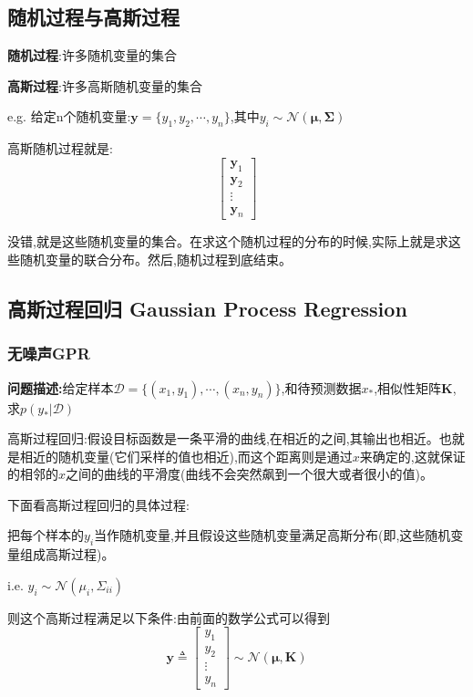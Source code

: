 \documentclass[UTF8,a4paper]{ctexart}
\begin{document}
        \subsection{随机过程与高斯过程}
        \textbf{随机过程}:许多随机变量的集合

        \textbf{高斯过程}:许多高斯随机变量的集合

        e.g. 给定n个随机变量:$\bm{y} = \{y_1 , y_2 , \cdots , y_n\}$,其中$y_i\sim \mathcal{N}(\bm{\mu} , \bm \Sigma )$

        高斯随机过程就是:
        \begin{equation}
            \left [
                \begin{array}{c}
                \bm y_1 \\
                \bm y_2\\
                \vdots \\
                \bm y_n
                \end{array}
            \right ]
        \end{equation}

        {\color{blue} 没错,就是这些随机变量的集合。在求这个随机过程的分布的时候,实际上就是求这些随机变量的联合分布。然后,随机过程到底结束。}

        \subsection{高斯过程回归  Gaussian Process Regression}
            \subsubsection{无噪声GPR}
            \textbf{问题描述:}给定样本$\mathcal{D} = \{ (x_1, y_1) , \cdots , (x_n , y_n) \}$,和待预测数据$x_*$,相似性矩阵$\bm K$,求$p(y_*| \mathcal{D})$

            高斯过程回归:假设目标函数是一条平滑的曲线,在相近的之间,其输出也相近。也就是相近的随机变量(它们采样的值也相近),而这个距离则是通过$x$来确定的,这就保证的相邻的$x$之间的曲线的平滑度(曲线不会突然飙到一个很大或者很小的值)。

            下面看高斯过程回归的具体过程:

            把每个样本的$y_i$当作随机变量,并且假设这些随机变量满足高斯分布(即,这些随机变量组成高斯过程)。

            i.e. $y_i \sim \mathcal{N}(\mu_i,\Sigma_{ii})$

            则这个高斯过程满足以下条件:{\color{blue}由前面的数学公式可以得到}
            \begin{equation}
                \bm{y}  \triangleq \left [
                    \begin{array}{c}
                     y_1 \\
                     y_2\\
                    \vdots \\
                     y_n
                    \end{array}
                \right ] \sim \mathcal{N}(\bm{\mu} , \bm{K})
            \end{equation}
\end{document}
